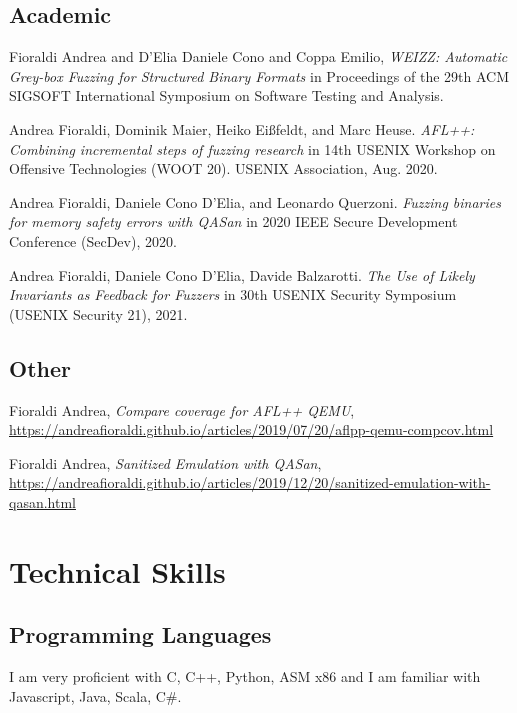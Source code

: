 \documentclass[10pt, a4paper]{article}
\newcommand{\years}[1]{\marginnote{\scriptsize #1}}
\begin{document}
\subsection*{Academic}

\noindent
\years{2020} Fioraldi Andrea and D'Elia Daniele Cono and Coppa Emilio, \textit{WEIZZ: Automatic Grey-box Fuzzing for Structured Binary Formats} in Proceedings of the 29th ACM SIGSOFT International Symposium on Software Testing and Analysis.

\noindent
\years{2020} Andrea Fioraldi, Dominik Maier, Heiko Eißfeldt, and Marc Heuse. \textit{AFL++: Combining incremental steps of fuzzing research} in 14th USENIX Workshop on Offensive Technologies (WOOT 20). USENIX Association, Aug. 2020.

\noindent
\years{2020} Andrea Fioraldi, Daniele Cono D’Elia, and Leonardo Querzoni. \textit{Fuzzing binaries for memory safety errors with QASan} in 2020 IEEE Secure Development Conference (SecDev), 2020.

\noindent
\years{2021} Andrea Fioraldi, Daniele Cono D'Elia, Davide Balzarotti. \textit{The Use of Likely Invariants as Feedback for Fuzzers} in 30th USENIX Security Symposium (USENIX Security 21), 2021.

\subsection*{Other}

\noindent
\years{2019} Fioraldi Andrea, \textit{Compare coverage for AFL++ QEMU}, \href{https://andreafioraldi.github.io/articles/2019/07/20/aflpp-qemu-compcov.html}{https://andreafioraldi.github.io/articles/2019/07/20/aflpp-qemu-compcov.html}

\noindent
\years{2019} Fioraldi Andrea, \textit{Sanitized Emulation with QASan}, \href{https://andreafioraldi.github.io/articles/2019/12/20/sanitized-emulation-with-qasan.html}{https://andreafioraldi.github.io/articles/2019/12/20/sanitized-emulation-with-qasan.html}

\section*{Technical Skills}

\subsection*{Programming Languages}

I am very proficient with C, C++, Python, ASM x86 and I am familiar with Javascript, Java, Scala, C\#.
\end{document}
